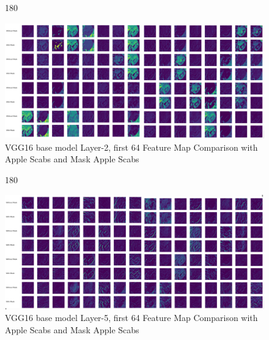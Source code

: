 \begin{figure}
    \centering
    \begin{turn}{180}
        \begin{minipage}{\linewidth}
        \centering
            \includegraphics[width=1\linewidth]{graphics//chapter7/mask comparison l2.png}
         \caption{VGG16 base model Layer-2, first 64 Feature Map Comparison with Apple Scabs and Mask Apple Scabs}
        \label{fig:comp-1-1}
        \end{minipage}
    \end{turn}
\end{figure}


\begin{figure}
    \centering
    \begin{turn}{180}
        \begin{minipage}{\linewidth}
        \centering
        \includegraphics[width=1\linewidth]{graphics//chapter7/fmap comp mask l5.png}
        \caption{VGG16 base model Layer-5, first 64 Feature Map Comparison with Apple Scabs and Mask Apple Scabs}
    \label{fig:comp-1-2}
        \end{minipage}
    \end{turn}
\end{figure}

